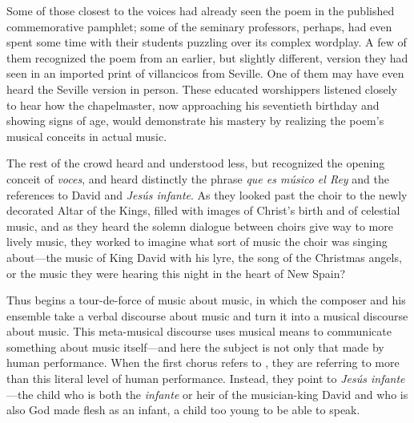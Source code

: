 Some of those closest to the voices had already seen the poem in the published
commemorative pamphlet; some of the seminary professors, perhaps, had even spent
some time with their students puzzling over its complex wordplay.
A few of them recognized the poem from an earlier, but slightly different,
version they had seen in an imported print of villancicos from Seville.
One of them may have even heard the Seville version in person.
These educated worshippers listened closely to hear how the chapelmaster, now
approaching his seventieth birthday and showing signs of age, would demonstrate
his mastery by realizing the poem's musical conceits in actual music.

The rest of the crowd heard and understood less, but recognized the opening
conceit of \emph{voces}, and heard distinctly the phrase \emph{que es músico el
Rey} and the references to David and \emph{Jesús infante}.
As they looked past the choir to the newly decorated Altar of the Kings, filled
with images of Christ's birth and of celestial music, and as they heard the
solemn dialogue between choirs give way to more lively music, they worked to
imagine what sort of music the choir was singing about---the music of King
David with his lyre, the song of the Christmas angels, or the music they were
hearing this night in the heart of New Spain?

Thus begins a tour-de-force of music about music, in which the composer and his
ensemble take a verbal discourse about music and turn it into a musical
discourse about music.
This meta-musical discourse uses musical means to communicate something about
music itself---and here the subject is not only that made by human performance.
When the first chorus refers to , they are referring to
more than this literal level of human performance.
Instead, they point to \emph{Jesús infante}---the child who is both the
\emph{infante} or heir of the musician-king David and who is also God made
flesh as an infant, a child too young to be able to speak.

